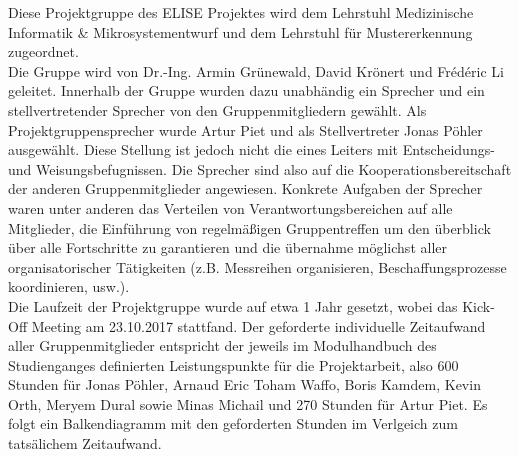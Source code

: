 

Diese Projektgruppe des ELISE Projektes wird dem Lehrstuhl Medizinische Informatik \& Mikrosystementwurf und dem Lehrstuhl f{\"u}r Mustererkennung zugeordnet. \\

Die Gruppe wird von Dr.-Ing. Armin Gr{\"u}newald, David Kr{\"o}nert und Frédéric Li geleitet. 
Innerhalb der Gruppe wurden dazu unabh{\"a}ndig ein Sprecher und ein stellvertretender Sprecher von den Gruppenmitgliedern gew{\"a}hlt. Als Projektgruppensprecher wurde Artur Piet und als Stellvertreter Jonas P{\"o}hler ausgew{\"a}hlt. 
Diese Stellung ist jedoch nicht die eines Leiters mit Entscheidungs- und Weisungsbefugnissen. Die Sprecher sind also auf die Kooperationsbereitschaft der anderen Gruppenmitglieder angewiesen. 
Konkrete Aufgaben der Sprecher waren unter anderen das Verteilen von Verantwortungsbereichen auf alle Mitglieder, die Einf{\"u}hrung von regelm{\"a}{\ss}igen Gruppentreffen um den {\"u}berblick {\"u}ber alle Fortschritte zu garantieren und die {\"u}bernahme m{\"o}glichst aller organisatorischer T{\"a}tigkeiten (z.B. Messreihen organisieren, Beschaffungsprozesse koordinieren, usw.). \\

Die Laufzeit der Projektgruppe wurde auf etwa 1 Jahr gesetzt, wobei das Kick-Off Meeting am 23.10.2017 stattfand. Der geforderte individuelle Zeitaufwand aller Gruppenmitglieder entspricht der jeweils im Modulhandbuch des Studienganges definierten Leistungspunkte f{\"u}r die Projektarbeit, also 600 Stunden f{\"u}r Jonas P{\"o}hler, Arnaud Eric Toham Waffo, Boris Kamdem, Kevin Orth, Meryem Dural sowie Minas Michail und 270 Stunden f{\"u}r Artur Piet. Es folgt ein Balkendiagramm mit den geforderten Stunden im Verlgeich zum tats{\"a}lichem Zeitaufwand. \\

